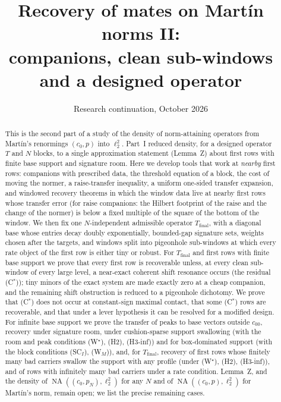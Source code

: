 \documentclass[10pt]{amsart}
\title[Recovery of mates on Mart\'in norms II]{Recovery of mates on Mart\'in norms II:\\companions, clean sub-windows and a designed operator}
\author{}
\date{Research continuation, October 2026}
\theoremstyle{definition}
\theoremstyle{remark}
\newcommand{\NA}{\operatorname{NA}}
\begin{document}
\begin{abstract}
This is the second part of a study of the density of norm-attaining
operators from Mart\'in's renormings $(c_0,p)$ into $\ell_2^2$.  Part~I
reduced density, for a designed operator $T$ and $N$ blocks, to a single
approximation statement (Lemma~Z) about first rows with finite base support
and signature room.  Here we develop tools that work at \emph{nearby} first
rows: companions with prescribed data, the threshold equation of a block,
the cost of moving the normer, a raise-transfer inequality, a uniform
one-sided transfer expansion, and windowed recovery theorems in which the
window data live at nearby first rows whose transfer error (for raise
companions: the Hilbert footprint of the raise and the change of the
normer) is below a fixed multiple of the square of the bottom of the
window.  We then fix one $N$-independent
admissible operator $T_{\mathrm{final}}$, with a diagonal base whose
entries decay doubly exponentially, bounded-gap signature sets, weights
chosen after the targets, and windows split into pigeonhole sub-windows at
which every rate object of the first row is either tiny or robust.  For
$T_{\mathrm{final}}$ and first rows with finite base support we prove that
every first row is recoverable unless, at every clean sub-window of every
large level, a near-exact coherent shift resonance occurs (the residual
(C$^*$)); tiny minors of the exact system are made exactly zero at a cheap
companion, and the remaining shift obstruction is reduced to a pigeonhole
dichotomy.  We prove that (C$^*$) does not occur at constant-sign maximal
contact, that some (C$^*$) rows are recoverable, and that under a lever
hypothesis it can be resolved for a modified design.  For infinite base
support we prove the transfer of peaks to base vectors outside $c_{00}$,
recovery under signature room, under cushion-sparse support swallowing
(with the room and peak conditions (W$^\star$), (H2), (H3-inf)) and for
box-dominated support (with the block conditions (SC$_I$), (W$_M$)), and,
for $T_{\mathrm{final}}$, recovery of first rows whose finitely many bad
carriers swallow the support with any profile (under (W$^\star$), (H2),
(H3-inf)), and of rows with infinitely many bad carriers under a rate
condition.  Lemma~Z, and the density of $\NA((c_0,p_N),\ell_2^2)$ for any
$N$ and of $\NA((c_0,p),\ell_2^2)$ for Mart\'in's norm, remain open; we
list the precise remaining cases.
\end{abstract}
\maketitle
\tableofcontents
\end{document}
